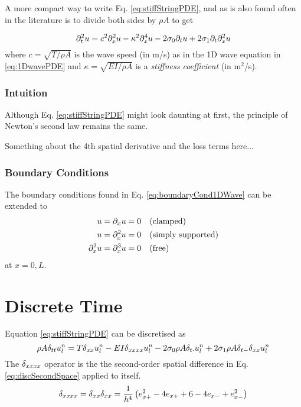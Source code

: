 A more compact way to write Eq. \eqref{eq:stiffStringPDE}, and as is also found often in the literature \cite{theBible}  is to divide both sides by $\rho A$ to get

\begin{equation}
    \partial_t^2 u = c^2 \partial_x^2 u - \kappa^2 \partial_x^4 u - 2 \sigma_{0} \partial_t u + 2 \sigma_{1} \partial_t \partial_x^2 u
\end{equation}
where $c=\sqrt{T/\rho A}$ is the wave speed  (in m/s) as in the 1D wave equation in \eqref{eq:1DwavePDE} and $\kappa = \sqrt{EI / \rho A}$ is a \textit{stiffness coefficient} (in m$^2$/s).

\subsubsection{Intuition}
Although Eq. \eqref{eq:stiffStringPDE} might look daunting at first, the principle of Newton's second law remains the same. 

Something about the 4th spatial derivative and the loss terms here...

\subsubsection{Boundary Conditions}
The boundary conditions found in Eq. \eqref{eq:boundaryCond1DWave} can be extended to
\begin{subequations}
    \begin{align}
        u = \partial_x u &= 0 \quad \text{(clamped)}\\
        u = \partial_x^2 u &= 0 \quad \text{(simply supported)}\\
        \partial_x^2 u = \partial_x^3 u &= 0 \quad \text{(free)}
    \end{align}
\end{subequations}
at $x = 0, L$.

\section{Discrete Time}
Equation \eqref{eq:stiffStringPDE} can be discretised as 
\begin{equation}\label{eq:stiffStringFDS}
    \rho A \delta_{tt} u_l^n = T \delta_{xx} u_l^n - EI \delta_{xxxx} u_l^n - 2 \sigma_{0} \rho A \delta_{t\cdot} u_l^n + 2 \sigma_{1} \rho A \delta_{t-}\delta_{xx} u_l^n
\end{equation}
The $\delta_{xxxx}$ operator is the  the second-order spatial difference in Eq. \eqref{eq:discSecondSpace} applied to itself. 
\begin{equation}\label{eq:dxxxx}
    \delta_{xxxx} = \delta_{xx}\delta_{xx} = \frac{1}{h^4}\left(e_{x+}^2 - 4e_{x+}+6 - 4e_{x-}+e_{x-}^2\right)
\end{equation}

